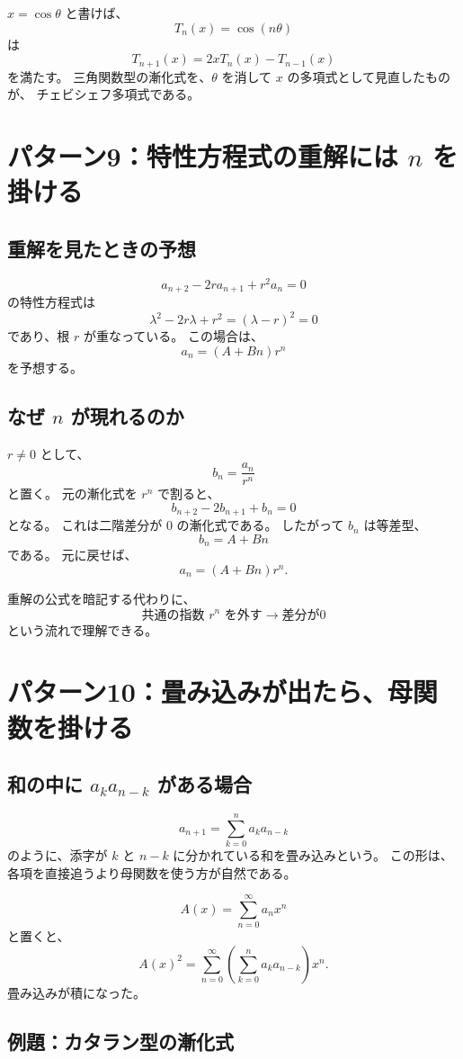 $x=\cos\theta$ と書けば、
\[
  T_n(x)=\cos(n\theta)
\]
は
\[
  T_{n+1}(x)=2xT_n(x)-T_{n-1}(x)
\]
を満たす。
三角関数型の漸化式を、$\theta$ を消して $x$ の多項式として見直したものが、
チェビシェフ多項式である。

\section{パターン9：特性方程式の重解には $n$ を掛ける}

\subsection{重解を見たときの予想}

\[
  a_{n+2}-2r a_{n+1}+r^2a_n=0
\]
の特性方程式は
\[
  \lambda^2-2r\lambda+r^2=(\lambda-r)^2=0
\]
であり、根 $r$ が重なっている。
この場合は、
\[
  a_n=(A+Bn)r^n
\]
を予想する。

\subsection{なぜ $n$ が現れるのか}

$r\neq0$ として、
\[
  b_n=\frac{a_n}{r^n}
\]
と置く。
元の漸化式を $r^{n}$ で割ると、
\[
  b_{n+2}-2b_{n+1}+b_n=0
\]
となる。
これは二階差分が $0$ の漸化式である。
したがって $b_n$ は等差型、
\[
  b_n=A+Bn
\]
である。
元に戻せば、
\[
  a_n=(A+Bn)r^n.
\]

重解の公式を暗記する代わりに、
\[
  \text{共通の指数 }r^n\text{ を外す}
  \longrightarrow
  \text{差分が0}
\]
という流れで理解できる。

\section{パターン10：畳み込みが出たら、母関数を掛ける}

\subsection{和の中に $a_ka_{n-k}$ がある場合}

\[
  a_{n+1}=\sum_{k=0}^{n}a_ka_{n-k}
\]
のように、添字が $k$ と $n-k$ に分かれている和を畳み込みという。
この形は、各項を直接追うより母関数を使う方が自然である。

\[
  A(x)=\sum_{n=0}^{\infty}a_nx^n
\]
と置くと、
\[
  A(x)^2
  =\sum_{n=0}^{\infty}
  \left(\sum_{k=0}^{n}a_ka_{n-k}\right)x^n.
\]
畳み込みが積になった。

\subsection{例題：カタラン型の漸化式}

